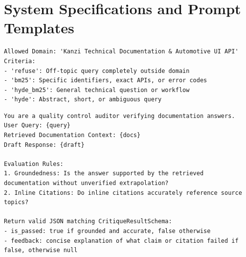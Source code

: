 \documentclass[sigconf,nonacm]{acmart}
\begin{document}
\section{System Specifications and Prompt Templates}

\begin{lstlisting}[caption={TypeSafe Jev Intent Routing Specification},label={lst:jev}]
Allowed Domain: 'Kanzi Technical Documentation & Automotive UI API'
Criteria:
- 'refuse': Off-topic query completely outside domain
- 'bm25': Specific identifiers, exact APIs, or error codes
- 'hyde_bm25': General technical question or workflow
- 'hyde': Abstract, short, or ambiguous query
\end{lstlisting}

\begin{lstlisting}[caption={System 2 Quality Audit Prompt},label={lst:audit}]
You are a quality control auditor verifying documentation answers.
User Query: {query}
Retrieved Documentation Context: {docs}
Draft Response: {draft}

Evaluation Rules:
1. Groundedness: Is the answer supported by the retrieved documentation without unverified extrapolation?
2. Inline Citations: Do inline citations accurately reference source topics?

Return valid JSON matching CritiqueResultSchema:
- is_passed: true if grounded and accurate, false otherwise
- feedback: concise explanation of what claim or citation failed if false, otherwise null
\end{lstlisting}
\end{document}

